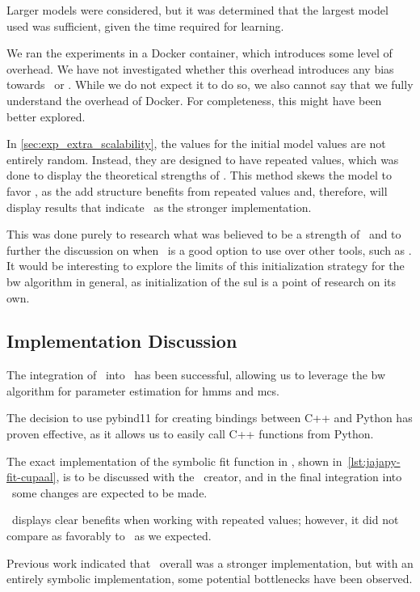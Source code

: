 Larger models were considered, but it was determined that the largest model used was sufficient, given the time required for learning.

We ran the experiments in a Docker container, which introduces some level of overhead.
We have not investigated whether this overhead introduces any bias towards \Jajapy\ or \Cupaal.
While we do not expect it to do so, we also cannot say that we fully understand the overhead of Docker.
For completeness, this might have been better explored.

In \autoref{sec:exp_extra_scalability}, the values for the initial model values are not entirely random. Instead, they are designed to have repeated values, which was done to display the theoretical strengths of \Cupaal.
This method skews the model to favor \Cupaal, as the \gls{add} structure benefits from repeated values and, therefore, will display results that indicate \Cupaal\ as the stronger implementation.

This was done purely to research what was believed to be a strength of \Cupaal\ and to further the discussion on when \Cupaal\ is a good option to use over other tools, such as \Jajapy.
It would be interesting to explore the limits of this initialization strategy for the \gls{bw} algorithm in general, as initialization of the \gls{sul} is a point of research on its own.


\subsection{Implementation Discussion}\label{subsec:implementation_discussion}
The integration of \Cupaal\ into \Jajapy\ has been successful, allowing us to leverage the \gls{bw} algorithm for parameter estimation for \glspl{hmm} and \glspl{mc}.

The decision to use pybind11 for creating bindings between C++ and Python has proven effective, as it allows us to easily call C++ functions from Python.

The exact implementation of the symbolic fit function in \Jajapy, shown in~\autoref{lst:jajapy-fit-cupaal}, is to be discussed with the \Jajapy\ creator, and in the final integration into \Jajapy\ some changes are expected to be made.

\Cupaal\ displays clear benefits when working with repeated values; however, it did not compare as favorably to \Jajapy\ as we expected.

Previous work indicated that \Cupaal\ overall was a stronger implementation, but with an entirely symbolic implementation, some potential bottlenecks have been observed.

